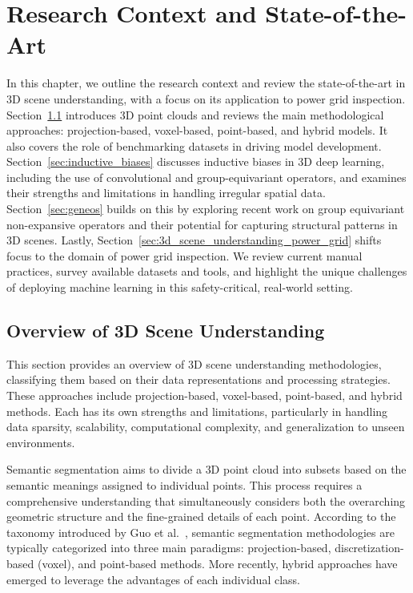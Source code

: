 
%

\chapter{Research Context and State-of-the-Art}\label{cha:sota}

In this chapter, we outline the research context and review the
state-of-the-art in 3D scene understanding, with a focus on its application to
power grid inspection. Section~\ref{sec:3d_scene_understanding} introduces 3D
point clouds and reviews the main methodological approaches: projection-based,
voxel-based, point-based, and hybrid models. It also covers the role of
benchmarking datasets in driving model development.
%
Section~\ref{sec:inductive_biases} discusses inductive biases in 3D deep
learning, including the use of convolutional and group-equivariant operators,
and examines their strengths and limitations in handling irregular spatial
data. Section~\ref{sec:geneos} builds on this by exploring recent work on group
equivariant non-expansive operators and their potential for capturing
structural patterns in 3D scenes.
%
Lastly, Section~\ref{sec:3d_scene_understanding_power_grid} shifts focus to the
domain of power grid inspection. We review current manual
practices, survey available datasets and tools, and highlight the unique
challenges of deploying machine learning in this safety-critical, real-world
setting.

\section{Overview of 3D Scene Understanding}\label{sec:3d_scene_understanding}

This section provides an overview of 3D scene understanding methodologies,
classifying them based on their data representations and processing strategies.
These approaches include projection-based, voxel-based, point-based, and hybrid
methods. Each has its own strengths and limitations, particularly in handling
data sparsity, scalability, computational complexity, and generalization to
unseen environments.

Semantic segmentation aims to divide a 3D point cloud into subsets based on the
semantic meanings assigned to individual points. This process requires a
comprehensive understanding that simultaneously considers both the overarching
geometric structure and the fine-grained details of each point. According to
the taxonomy introduced by Guo et al.~\cite{guo2020deep}, semantic segmentation
methodologies are typically categorized into three main paradigms:
projection-based, discretization-based (voxel), and point-based methods. More
recently, hybrid approaches have emerged to leverage the advantages of each
individual class.

